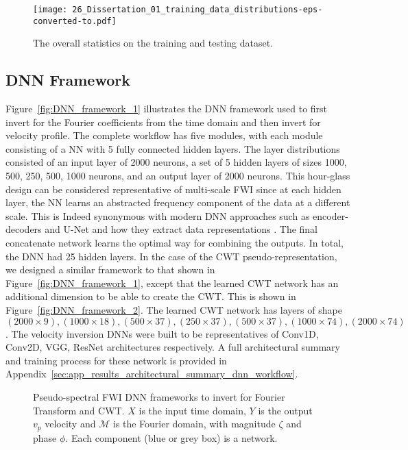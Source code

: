 \begin{figure}[ht!]
    \centering
    \texttt{[image: 26\_Dissertation\_01\_training\_data\_distributions-eps-converted-to.pdf]}
    \caption[The overall statistics on the training and testing dataset.]{The overall statistics on the training and testing dataset.}
    \label{fig:data_generators_params}
\end{figure}

\subsection{DNN Framework}\label{sec:results_DNN_Framework}
Figure~\ref{fig:DNN_framework_1} illustrates the DNN framework used to first invert for the Fourier coefficients from the time domain and then invert for velocity profile. The complete workflow has five modules, with each module consisting of a NN with 5 fully connected hidden layers. The layer distributions consisted of an input layer of 2000 neurons, a set of 5 hidden layers of sizes 1000, 500, 250, 500, 1000 neurons, and an output layer of 2000 neurons. This hour-glass design can be considered representative of multi-scale FWI \citep{Bunks1995} since at each hidden layer, the NN learns an abstracted frequency component of the data at a different scale. This is Indeed synonymous with modern DNN approaches such as encoder-decoders and U-Net \citep{ronneberger2015u} and how they extract data representations \citep{Yu2019,Berthelot2018}. The final concatenate network learns the optimal way for combining the outputs. In total, the DNN had 25 hidden layers. In the case of the CWT pseudo-representation, we designed a similar framework to that shown in Figure~\ref{fig:DNN_framework_1}, except that the learned CWT network has an additional dimension to be able to create the CWT. This is shown in Figure~\ref{fig:DNN_framework_2}. The learned CWT network has layers of shape $(2000\times9), (1000\times18), (500\times37), (250\times37), (500\times37), (1000\times74), (2000\times74)$. The velocity inversion DNNs were built to be representatives of Conv1D, Conv2D, VGG, ResNet architectures respectively. A full architectural summary and training process for these network is provided in Appendix~\ref{sec:app_results_architectural_summary_dnn_workflow}.

\begin{figure}[!ht]
	\centering
	\caption[Pseudo-spectral FWI DNN workflow.]{Pseudo-spectral FWI DNN frameworks to invert for Fourier Transform and CWT. $X$ is the input time domain, $Y$ is the output $v_p$ velocity and $\mathcal{M}$ is the Fourier domain, with magnitude $\zeta$ and phase $\phi$. Each component (blue or grey box) is a network.}         
	\label{fig:DNN_frameworks}
\end{figure}

